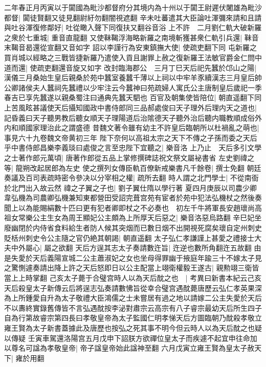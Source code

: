 二年春正月丙寅以于闐國為毗沙都督府分其境内為十州以于闐王尉遲伏闍雄為毗沙都督|{
	闐徒賢翻又徒見翻尉紆勿翻闇視遮翻}
辛未吐蕃遣其大臣論吐渾彌來請和且請與吐谷渾復修鄰好|{
	吐從瞰入聲下同復扶又翻谷音浴}
上不許　二月劉仁軌大破新羅之衆於七重城|{
	重音直龍翻}
又使靺鞨浮海略新羅之南境斬獲甚衆仁軌引兵還|{
	靺音末鞨音曷還從宣翻又音如字}
詔以李謹行為安東鎮撫大使|{
	使疏吏翻下同}
屯新羅之買肖城以經略之三戰皆捷新羅乃遣使入貢且謝罪上赦之復新羅王法敏官爵金仁問中道而還|{
	使疏吏翻還音旋又如字}
改封臨海郡公　三月丁巳天后祀先蠶於邙山之陽|{
	漢儀三月桑始生皇后親桑於苑中蠶室養蠶千薄以上祠以中牢羊豕續漢志三月皇后帥公卿諸侯夫人蠶祠先蠶禮以少牢注云今蠶神曰苑疏婦人寓氏公主唐制皇后歲祀一季春吉已享先蠶遂以親桑蜀注曰通典先蠶天駟也}
百官及朝集使皆陪位|{
	朝直遥翻下同}
上苦風眩甚議使天后攝知國政中書侍郎同三品郝處俊曰天子理外后理内天之道也|{
	記昏義曰天子聽男教后聽女順天子理陽道后治隂德天子聽外治后聽内職教順成俗外内和順國家理治此之謂盛德}
昔魏文著令雖有幼主不許皇后臨朝所以杜禍亂之萌也|{
	事見六十九卷魏文帝黄初三年}
陛下奈何以高祖太宗之天下不傳之子孫而委之天后乎中書侍郎昌樂李義琰曰處俊之言至忠陛下宜聽之|{
	樂音洛}
上乃止　天后多引文學之士著作郎元萬頃|{
	唐著作郎從五品上掌修撰碑誌祝文祭文屬袐書省}
左史劉禕之等|{
	龍朔改起居郎為左史}
使之撰列女傳臣軌百僚新戒樂書凡千餘卷|{
	撰士免翻}
朝廷奏議及百司表疏時密令參决以分宰相之權|{
	疏所去翻}
時人謂之北門學士|{
	不從南衙於北門出入故云然}
禕之子翼之子也|{
	劉子翼仕隋以學行著}
夏四月庚辰以司農少卿韋弘機為司農卿弘機兼知東都營田受詔完葺宫苑有宦者於苑中犯法弘機杖之然後奏聞上以為能賜絹數十匹曰更有犯者卿即杖之不必奏也　初左千牛將軍長安趙瓌尚高祖女常樂公主生女為周王顯妃公主頗為上所厚天后惡之|{
	樂音洛惡烏路翻}
辛巳妃坐廢幽閉於内侍省食料給生者防人候其突烟而已數日烟不出開視死腐矣瓌自定州刺史貶栝州刺史令公主隨之官仍絶其朝謁|{
	朝直遥翻}
太子弘仁孝謙謹上甚愛之禮接士大夫中外屬心|{
	屬之欲翻}
天后方逞其志太子奏請數迕旨|{
	迕逆也數所角翻迕五故翻}
由是失愛於天后義陽宣城二公主蕭淑妃之女也坐母得罪幽于掖庭年踰三十不嫁太子見之驚惻遽奏請出降上許之天后怒即日以公主配當上翊衛權毅王遂古|{
	親勲翊三衛皆當上上時掌翻}
己亥太子薨于合璧宫時人以為天后酖之也　|{
	考異曰新書本紀云己亥天后殺皇太子新傳云后將逞志弘奏請數怫旨從幸合璧宫遇酖薨唐歷云弘仁孝英果深為上所鍾愛自升為太子敬禮大臣鴻儒之士未嘗居有過之地以請嫁二公主失愛於天后不以夀終實錄舊傳皆不言弘遇酖按李泌對肅宗云高宗有八子睿宗最幼天后所生四子自為行第故睿宗第四長曰孝敬皇帝為太子監國仁明孝悌天后方圖臨朝乃酖殺孝敬立雍王賢為太子新書蓋據此及唐歷也按弘之死其事不明今但云時人以為天后酖之也疑以傳疑}
壬寅車駕還洛陽宫五月戊申下詔朕方欲禪位皇太子而疾遽不起宜申往命加以尊名可諡為孝敬皇帝|{
	帝子諡皇帝始此諡神至翻}
六月戊寅立雍王賢為皇太子赦天下|{
	雍於用翻}

